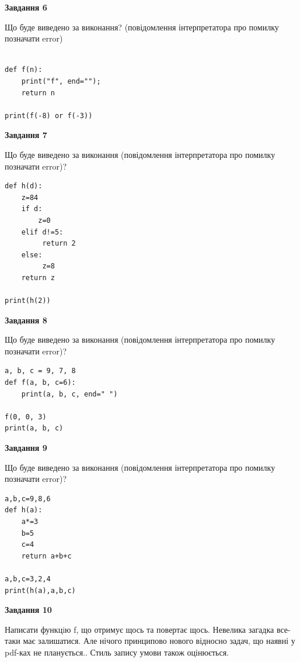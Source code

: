 \documentclass[12pt, ukrainian]{article}
\begin{document}
{\begin {large}
{\begin {center}\textbf{Завдання 6}\end {center}}

Що буде виведено за виконання? (повідомлення інтерпретатора про помилку позначати error)\par
\begin{verbatim}

def f(n):
    print("f", end="");
    return n

print(f(-8) or f(-3))
\end{verbatim}

{\begin {center}\textbf{Завдання 7}\end {center}}

Що буде виведено за виконання (повідомлення інтерпретатора про помилку позначати error)?\par
\begin{verbatim}
def h(d):
    z=84
    if d: 
        z=0
    elif d!=5:
         return 2
    else:
         z=8
    return z

print(h(2))
\end{verbatim}

{\begin {center}\textbf{Завдання 8}\end {center}}

Що буде виведено за виконання (повідомлення інтерпретатора про помилку позначати error)?\par
\begin{verbatim}
a, b, c = 9, 7, 8
def f(a, b, c=6):
    print(a, b, c, end=" ")

f(0, 0, 3)
print(a, b, c)
\end{verbatim}

{\begin {center}\textbf{Завдання 9}\end {center}}

Що буде виведено за виконання (повідомлення інтерпретатора про помилку позначати error)?\par
\begin{verbatim}
a,b,c=9,8,6
def h(a):
    a*=3
    b=5
    c=4
    return a+b+c

a,b,c=3,2,4
print(h(a),a,b,c)
\end{verbatim}

{\begin {center}\textbf{Завдання 10}\end {center}}


Написати функцiю f, що отримує щось та повертає щось. Невелика загадка все-таки має залишатися. Але нічого принципово нового відносно задач, що наявні у pdf-ках не планується.. Стиль запису умови також оцінюється.\par
\end {large}}
\newpage
\end{document}
